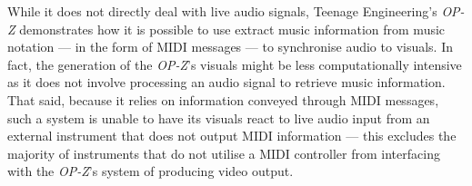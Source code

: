 \documentclass[../../main_report2.tex]{subfiles}
\begin{document}
While it does not directly deal with live audio signals, Teenage Engineering's \textit{OP-Z} demonstrates how it is possible to use extract music information from music notation --- in the form of MIDI messages --- to synchronise audio to visuals. In fact, the generation of the \textit{OP-Z}'s visuals might be less computationally intensive as it does not involve processing an audio signal to retrieve music information. That said, because it relies on information conveyed through MIDI messages, such a system is unable to have its visuals react to live audio input from an external instrument that does not output MIDI information --- this excludes the majority of instruments that do not utilise a MIDI controller from interfacing with the \textit{OP-Z}'s system of producing video output.

\end{document}
